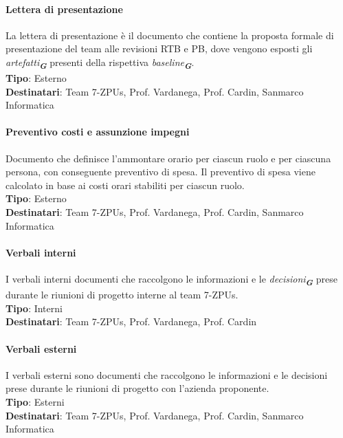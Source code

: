 \documentclass[a4paper,12pt]{article}
\newcommand{\glossario}[1]{\textit{#1}\textsubscript{\textbf{\textit{\textcolor{lightblack}{G}}}}}
\begin{document}
\paragraph{Lettera di presentazione}\label{letteraDiPresentazione}
La lettera di presentazione è il documento che contiene la proposta formale di
presentazione del team alle revisioni RTB e PB, dove vengono esposti gli
\glossario{artefatti} presenti della rispettiva \glossario{baseline}. \\
\textbf{Tipo}: Esterno \\ \textbf{Destinatari}: Team 7-ZPUs, Prof. Vardanega,
Prof. Cardin, Sanmarco Informatica \\

\paragraph{Preventivo costi e assunzione impegni}\label{preventivoCostiEAssunzioneImpegni}
Documento che definisce l'ammontare orario per ciascun ruolo e per ciascuna
persona, con conseguente preventivo di spesa. Il preventivo di spesa viene
calcolato in base ai costi orari stabiliti per ciascun ruolo. \\ \textbf{Tipo}:
Esterno \\ \textbf{Destinatari}: Team 7-ZPUs, Prof. Vardanega, Prof. Cardin,
Sanmarco Informatica \\

\paragraph{Verbali interni}
I verbali interni documenti che raccolgono le informazioni e le
\glossario{decisioni} prese durante le riunioni di progetto interne al team
7-ZPUs. \\ \textbf{Tipo}: Interni \\ \textbf{Destinatari}: Team 7-ZPUs, Prof.
Vardanega, Prof. Cardin \\

\paragraph{Verbali esterni}
I verbali esterni sono documenti che raccolgono le informazioni e le decisioni
prese durante le riunioni di progetto con l'azienda proponente. \\
\textbf{Tipo}: Esterni \\ \textbf{Destinatari}: Team 7-ZPUs, Prof. Vardanega,
Prof. Cardin, Sanmarco Informatica \\
\end{document}
